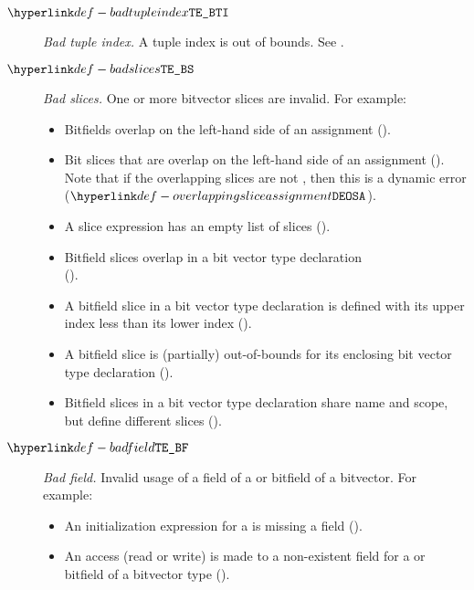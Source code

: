 \begin{description}
\hypertarget{def-badtupleindex}{}
\item[$\BadTupleIndex$]
  \textit{Bad tuple index.}
  A tuple index is out of bounds.
  See .

\hypertarget{def-badslices}{}
\item[$\BadSlices$]
  \textit{Bad slices.}
  One or more bitvector slices are invalid.
  For example:
  \begin{itemize}
    \item Bitfields overlap on the left-hand side of an assignment ().
    \item Bit slices that are \symbolicallyevaluable{} overlap on the left-hand side of an assignment ().
      Note that if the overlapping slices are not \symbolicallyevaluable{}, then this is a dynamic error ($\OverlappingSliceAssignment$).
    \item A slice expression has an empty list of slices ().
    \item Bitfield slices overlap in a bit vector type declaration \\
      ().
    \item A bitfield slice in a bit vector type declaration is defined with its upper index less than its lower index ().
    \item A bitfield slice is (partially) out-of-bounds for its enclosing bit vector type declaration ().
    \item Bitfield slices in a bit vector type declaration share name and scope, but define different slices ().
  \end{itemize}

\hypertarget{def-badfield}{}
\item[$\BadField$]
  \textit{Bad field.}
  Invalid usage of a field of a \structuredtype{} or bitfield of a bitvector.
  For example:
  \begin{itemize}
    \item An initialization expression for a \structuredtype{} is missing a field ().
    \item An access (read or write) is made to a non-existent field for a \structuredtype{} or bitfield of a bitvector type ().
  \end{itemize}


\end{description}
